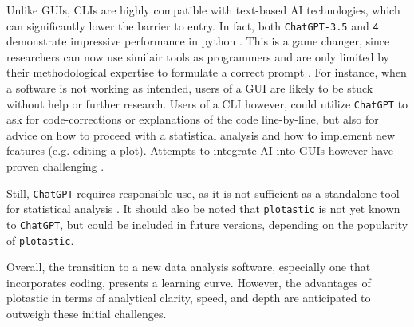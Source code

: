 Unlike GUIs, CLIs are highly compatible with text-based AI technologies, which
can significantly lower the barrier to entry. In fact, both \texttt{ChatGPT-3.5}
and \texttt{4} demonstrate impressive performance in python
\cite{arefinUnmaskingGiantComprehensive2023}. This is a game changer, since
researchers can now use similair tools as programmers and are only limited by
their methodological expertise to formulate a correct prompt
\cite{qureshiAreChatGPTLarge2023}. For instance, when a software is not
working as intended, users of a GUI are likely to be stuck without help or
further research. Users of a CLI however, could utilize \texttt{ChatGPT} to ask for
code-corrections or explanations of the code line-by-line, but also for advice
on how to proceed with a statistical analysis and how to implement new features
(e.g. editing a plot). Attempts to integrate AI into GUIs however have proven
challenging \cite{gaoASSISTGUITaskOrientedDesktop2024}.

Still, \texttt{ChatGPT} requires responsible use, as it is not sufficient as a standalone
tool for statistical analysis \cite{ordakChatGPTSkillsStatistical2023}. It
should also be noted that \texttt{plotastic} is not yet known to \texttt{ChatGPT}, but
could be included in future versions, depending on the popularity of
\texttt{plotastic}.

Overall, the transition to a new data analysis software, especially one
that incorporates coding, presents a learning curve. However, the advantages of
plotastic in terms of analytical clarity, speed, and depth are anticipated to
outweigh these initial challenges.


